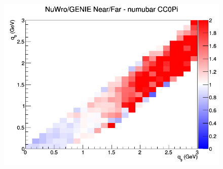 \documentclass[12pt]{article}
\begin{document}
\begin{figure}[h]
\endminipage
{}
\includegraphics[width=\linewidth]{q0_q3/nominal/ratios/CC0Pi_NuWro_GENIE_numubar_NF_q3_q0.png}
\endminipage
\newline
\end{figure}
\clearpage
\end{document}
